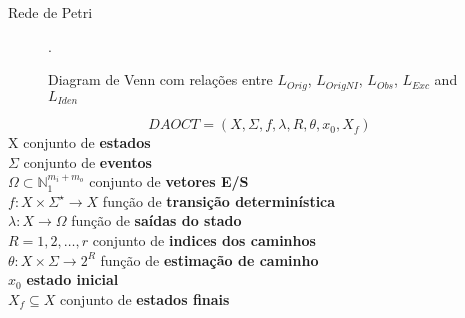 \documentclass[aspectratio=169,14pt]{beamer} %
\begin{document}
\begin{frame}{Rede de Petri}
\begin{figure}[H]
 \begin{minipage}{1.2\wd0}
  \centering
   \caption{Diagram de Venn com relações entre $L_{Orig}$, $L_{OrigNI}$,
    $L_{Obs}$, $L_{Exc}$ and $L_{Iden}$}.
 \end{minipage}
  \label{fig:languagesVenn}
\end{figure}
\end{frame}


\begin{frame}
\begin{definition}[DAOCT]
  \label{def:daoct}
  \small
  \[ DAOCT = (X,\Sigma,f,\lambda,R,\theta, x_0,X_f)\]
  \indent X conjunto de \textbf{estados} \\
  \indent $\Sigma$ conjunto de \textbf{eventos}\\
  \indent $\Omega \subset \mathbb{N}_1^{m_i+m_o} $ conjunto de \textbf{vetores E/S}\\
  \indent $f:  X \times \Sigma^\star \rightarrow X$ função de  \textbf{transição determinística}\\
  \indent $\lambda : X \rightarrow \Omega$ função de  \textbf{saídas do stado}\\
  \indent $R = {1,2,\dots,r}$ conjunto de \textbf{indices dos caminhos}\\
  \indent $\theta : X \times \Sigma \rightarrow 2^R$ função de \textbf{estimação
    de caminho}\\
  \indent $x_0$ \textbf{estado inicial} \\
  \indent $X_f \subseteq X $ conjunto de \textbf{estados finais}
\end{definition}
\end{frame}
\end{document}
